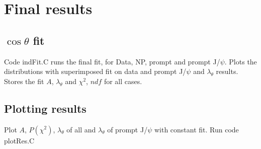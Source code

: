\documentclass{article}
\newcommand{\cost}{\cos\theta}
\begin{document}
\pagebreak

\section{Final results}

\subsection{$\cost$ fit}

Code indFit.C runs the final fit, for  Data, NP, prompt and prompt J/$\psi$. Plots the distributions with superimposed fit on data and prompt J/$\psi$ and $\lambda_\theta$ results. Stores the fit $A$, $\lambda_\theta$ and $\chi^2$, $ndf$ for all cases. 

\subsection{Plotting results}

Plot $A$, $P(\chi^2)$, $\lambda_\theta$ of all and $\lambda_\theta$ of prompt J/$\psi$ with constant fit. Run code plotRes.C
\end{document}
